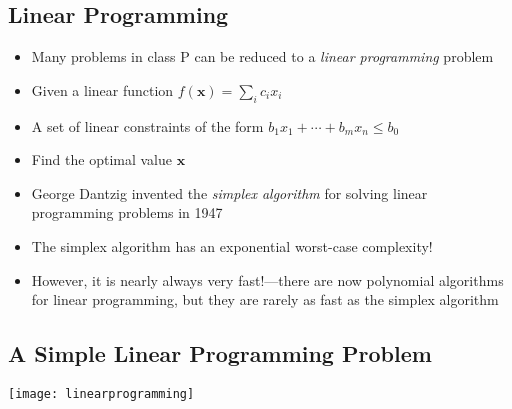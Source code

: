 
\begin{slide}
\section[-1.5]{Linear Programming}

\begin{PauseHighLight}
  \begin{itemize}\squeeze
  \item Many problems in class P can be reduced to a \emph{linear
    programming} problem\pause
  \item Given a linear function $f(\bm{x})= \sum_i c_i x_i$\pause
  \item A set of linear constraints of the form $b_1 x_1 + \cdots +
    b_m x_n \leq b_0$\pause
  \item Find the optimal value $\bm{x}$\pause
  \item George Dantzig invented the \emph{simplex algorithm} for solving
    linear programming problems in 1947\pause
  \item The simplex algorithm has an exponential worst-case
    complexity!\pause
  \item However, it is nearly always very fast!---there are now
    polynomial algorithms for linear programming, but they are rarely as
    fast as the simplex algorithm\pause
  \end{itemize}
\end{PauseHighLight}

\end{slide}


\begin{slide}
\section[-1]{A Simple Linear Programming Problem}

\begin{center}
  \texttt{[image: linearprogramming]}
\end{center}
\end{slide}


